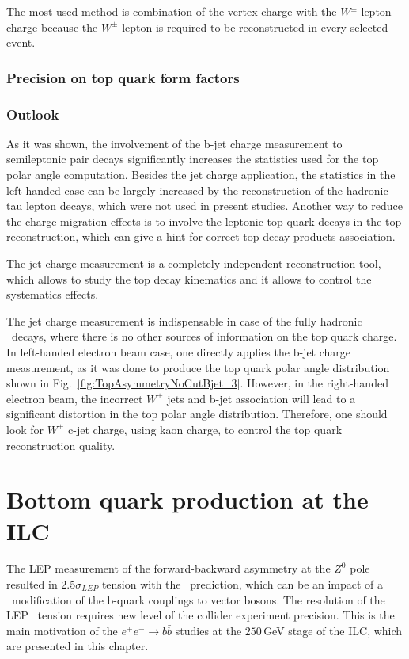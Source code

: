 The most used method is combination of the vertex charge with the $W^\pm$ lepton charge because the $W^\pm$ lepton is required to be reconstructed in every selected event. 
\subsubsection{Precision on top quark form factors }

\subsubsection{Outlook}
As it was shown, the involvement of the b-jet charge measurement to semileptonic \ttbar pair decays significantly increases the statistics used for the top polar angle computation.
Besides the jet charge application, the statistics in the left-handed case can be largely increased by the reconstruction of the hadronic tau lepton decays, which were not used in present studies. 
Another way to reduce the charge migration effects is to involve the leptonic top quark decays in the top reconstruction, which can give a hint for correct top decay products association.

The jet charge measurement is a completely independent reconstruction tool, which allows to study the top decay kinematics and it allows to control the systematics effects.

The jet charge measurement is indispensable in case of the fully hadronic \ttbar\ decays, where there is no other sources of information on the top quark charge. 
In left-handed electron beam case, one directly applies the b-jet charge measurement, as it was done to produce the top quark polar angle distribution shown in Fig.~\ref{fig:TopAsymmetryNoCutBjet_3}. 
However, in the right-handed electron beam, the incorrect $W^\pm$ jets and b-jet association will lead to a significant distortion in the top polar angle distribution. Therefore, one should look for $W^\pm$ c-jet charge, using kaon charge, to control the top quark reconstruction quality. 


\section{Bottom quark production at the ILC}
The LEP measurement of the forward-backward asymmetry at the $Z^0$ pole resulted in 2.5$\sigma_{LEP}$ tension with the \sm\ prediction, which can be an impact of a \bsm\ modification of the b-quark couplings to vector bosons.
The resolution of the LEP \afbb\ tension requires new level of the collider experiment precision.
This is the main motivation of the $e^+e^-\to b\bar{b}$ studies at the $250$\,GeV stage of the ILC, which are presented in this chapter. 

